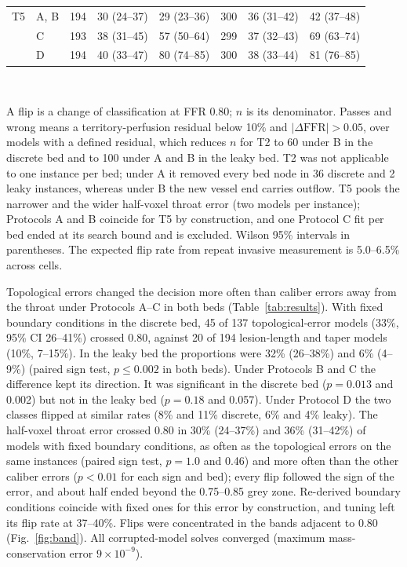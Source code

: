 \documentclass[journal,twoside,web]{ieeecolor}
\begin{document}
\begin{table}[!t]
\begin{tabular}{@{}llrccrcc@{}}
\addlinespace[2pt]
T5 & A, B & 194 & 30 (24--37) & 29 (23--36) & 300 & 36 (31--42) & 42 (37--48) \\
 & C & 193 & 38 (31--45) & 57 (50--64) & 299 & 37 (32--43) & 69 (63--74) \\
 & D & 194 & 40 (33--47) & 80 (74--85) & 300 & 38 (33--44) & 81 (76--85) \\
\bottomrule
\end{tabular}
\\[2pt]
\parbox{\textwidth}{\footnotesize A flip is a change of classification at FFR 0.80; $n$ is its denominator. Passes and wrong means a territory-perfusion residual below 10\% and $|\Delta\mathrm{FFR}| > 0.05$, over models with a defined residual, which reduces $n$ for T2 to 60 under B in the discrete
bed and to 100 under A and B in the leaky bed. T2 was not applicable to one instance per bed; under A it removed every bed node in 36 discrete and 2 leaky instances, whereas under B the new vessel end carries outflow. T5 pools the narrower and the wider half-voxel throat error (two models per instance); Protocols A and B coincide for T5 by construction, and one Protocol C fit per bed ended at its search bound and is excluded. Wilson 95\% intervals in parentheses. The expected flip
rate from repeat invasive measurement is 5.0--6.5\% across cells.}
\end{table}

Topological errors changed the decision more often than caliber errors away from the throat under Protocols A--C in both beds
(Table~\ref{tab:results}). With fixed boundary conditions in the discrete bed, 45 of 137 topological-error models
(33\%, 95\% CI 26--41\%) crossed 0.80, against 20 of 194 lesion-length and taper models (10\%, 7--15\%). In the leaky bed the
proportions were 32\% (26--38\%) and 6\% (4--9\%) (paired sign test, $p \leq 0.002$ in both beds). Under
Protocols B and C the difference kept its direction. It was significant in the discrete bed
($p = 0.013$ and 0.002) but not in the leaky bed ($p = 0.18$ and 0.057). Under Protocol D the two classes
flipped at similar rates (8\% and 11\% discrete, 6\% and 4\% leaky). The half-voxel throat error crossed 0.80 in
30\% (24--37\%) and 36\% (31--42\%) of models with fixed boundary conditions, as often as the topological errors on
the same instances (paired sign test, $p = 1.0$ and 0.46) and more often than the other caliber errors ($p < 0.01$
for each sign and bed); every flip followed the sign of the error, and about half ended beyond the 0.75--0.85 grey
zone. Re-derived boundary conditions coincide with fixed ones for this error by construction, and tuning left its
flip rate at 37--40\%. Flips were concentrated in the bands adjacent to 0.80 (Fig.~\ref{fig:band}). All corrupted-model solves converged (maximum mass-conservation error $9\times10^{-9}$).
\end{document}
